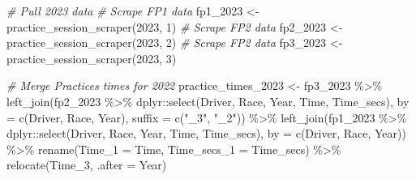 \documentclass[
]{book}
\newenvironment{Shaded}{\begin{snugshade}}{\end{snugshade}}
\newcommand{\AttributeTok}[1]{\textcolor[rgb]{0.77,0.63,0.00}{#1}}
\newcommand{\CommentTok}[1]{\textcolor[rgb]{0.56,0.35,0.01}{\textit{#1}}}
\newcommand{\DecValTok}[1]{\textcolor[rgb]{0.00,0.00,0.81}{#1}}
\newcommand{\FunctionTok}[1]{\textcolor[rgb]{0.00,0.00,0.00}{#1}}
\newcommand{\NormalTok}[1]{#1}
\newcommand{\OtherTok}[1]{\textcolor[rgb]{0.56,0.35,0.01}{#1}}
\newcommand{\SpecialCharTok}[1]{\textcolor[rgb]{0.00,0.00,0.00}{#1}}
\newcommand{\StringTok}[1]{\textcolor[rgb]{0.31,0.60,0.02}{#1}}
\begin{document}
\begin{Shaded}
\begin{Highlighting}[]
\CommentTok{\# Pull 2023 data}
\CommentTok{\# Scrape FP1 data}
\NormalTok{fp1\_2023 }\OtherTok{\textless{}{-}} \FunctionTok{practice\_session\_scraper}\NormalTok{(}\DecValTok{2023}\NormalTok{, }\DecValTok{1}\NormalTok{)}
\CommentTok{\# Scrape FP2 data}
\NormalTok{fp2\_2023 }\OtherTok{\textless{}{-}} \FunctionTok{practice\_session\_scraper}\NormalTok{(}\DecValTok{2023}\NormalTok{, }\DecValTok{2}\NormalTok{)}
\CommentTok{\# Scrape FP2 data}
\NormalTok{fp3\_2023 }\OtherTok{\textless{}{-}} \FunctionTok{practice\_session\_scraper}\NormalTok{(}\DecValTok{2023}\NormalTok{, }\DecValTok{3}\NormalTok{)}

\CommentTok{\# Merge Practices times for 2022}
\NormalTok{practice\_times\_2023 }\OtherTok{\textless{}{-}}\NormalTok{ fp3\_2023 }\SpecialCharTok{\%\textgreater{}\%}
  \FunctionTok{left\_join}\NormalTok{(fp2\_2023 }\SpecialCharTok{\%\textgreater{}\%}
\NormalTok{              dplyr}\SpecialCharTok{::}\FunctionTok{select}\NormalTok{(}\StringTok{\textquotesingle{}Driver\textquotesingle{}}\NormalTok{, }\StringTok{\textquotesingle{}Race\textquotesingle{}}\NormalTok{, }\StringTok{\textquotesingle{}Year\textquotesingle{}}\NormalTok{, }\StringTok{\textquotesingle{}Time\textquotesingle{}}\NormalTok{, }\StringTok{\textquotesingle{}Time\_secs\textquotesingle{}}\NormalTok{), }\AttributeTok{by =} \FunctionTok{c}\NormalTok{(}\StringTok{\textquotesingle{}Driver\textquotesingle{}}\NormalTok{, }\StringTok{\textquotesingle{}Race\textquotesingle{}}\NormalTok{, }\StringTok{\textquotesingle{}Year\textquotesingle{}}\NormalTok{), }\AttributeTok{suffix =} \FunctionTok{c}\NormalTok{(}\StringTok{"\_3"}\NormalTok{, }\StringTok{"\_2"}\NormalTok{)) }\SpecialCharTok{\%\textgreater{}\%}
  \FunctionTok{left\_join}\NormalTok{(fp1\_2023 }\SpecialCharTok{\%\textgreater{}\%}
\NormalTok{              dplyr}\SpecialCharTok{::}\FunctionTok{select}\NormalTok{(}\StringTok{\textquotesingle{}Driver\textquotesingle{}}\NormalTok{, }\StringTok{\textquotesingle{}Race\textquotesingle{}}\NormalTok{, }\StringTok{\textquotesingle{}Year\textquotesingle{}}\NormalTok{, }\StringTok{\textquotesingle{}Time\textquotesingle{}}\NormalTok{, }\StringTok{\textquotesingle{}Time\_secs\textquotesingle{}}\NormalTok{), }\AttributeTok{by =} \FunctionTok{c}\NormalTok{(}\StringTok{\textquotesingle{}Driver\textquotesingle{}}\NormalTok{, }\StringTok{\textquotesingle{}Race\textquotesingle{}}\NormalTok{, }\StringTok{\textquotesingle{}Year\textquotesingle{}}\NormalTok{)) }\SpecialCharTok{\%\textgreater{}\%}
  \FunctionTok{rename}\NormalTok{(}\AttributeTok{Time\_1 =}\NormalTok{ Time, }\AttributeTok{Time\_secs\_1 =}\NormalTok{ Time\_secs) }\SpecialCharTok{\%\textgreater{}\%} 
  \FunctionTok{relocate}\NormalTok{(Time\_3, }\AttributeTok{.after =}\NormalTok{ Year)}
\end{Highlighting}
\end{Shaded}
\end{document}
